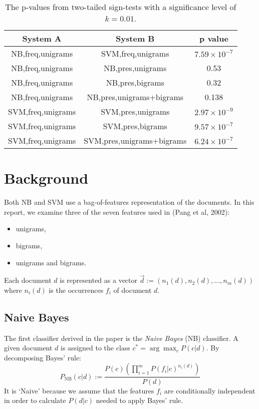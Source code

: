 \documentclass[12pt]{article}
\begin{document}
\begin{multicols}{2}
\begin{table*}[t]
\centering
 \begin{tabular}{|c|c||c|} 
 \hline
  System A & System B & p value\\ [0.5ex] 
 \hline\hline
NB,freq,unigrams & SVM,freq,unigrams & $7.59\times 10^{-7}$\\
 \hline
NB,freq,unigrams & NB,pres,unigrams & 0.53\\
 \hline
NB,freq,unigrams & NB,pres,bigrams & 0.32\\
 \hline
NB,freq,unigrams & NB,pres,unigrams+bigrams & 0.138 \\
 \hline
SVM,freq,unigrams & SVM,pres,unigrams & $2.97\times 10^{-9}$ \\
 \hline
SVM,freq,unigrams & SVM,pres,bigrams & $9.57\times 10^{-7}$ \\
 \hline
 SVM,freq,unigrams & SVM,pres,unigrams+bigrams & $6.24\times 10^{-7}$ \\
 \hline
\end{tabular}
\caption{The p-values from two-tailed sign-tests with a significance level of $k = 0.01$.} \label{table:p-values}
\end{table*}

\section{Background}

Both NB and SVM use a bag-of-features representation of the documents. In this report, we examine three of the seven features used in (Pang et al, 2002):
\vspace{-\topsep}
\begin{itemize}
\setlength{\parskip}{0pt}
\setlength{\itemsep}{0pt plus 1pt}
	\item unigrams,
	\item bigrams,
	\item unigrams and bigrams.
\end{itemize}
\vspace{-\topsep}

Each document $d$ is represented as a vector $\vec{d} := (n_{1}(d), n_{2}(d),\ldots,n_{m}(d))$ where $n_{i}(d)$ is the occurrences $f_{i}$ of document $d$.

\subsection{Naive Bayes}

The first classifier derived in the paper is the \emph{Naive Bayes} (NB) classifier. A given document $d$ is assigned to the class $c^{*} = \arg \max_{c}P(c | d)$. By decomposing Bayes' rule:
\[P_\mathrm{NB}(c | d) := \frac{P(c)(\prod^{m}_{i=1}P(f_{i} | c)^{n_{i}(d)})}{P(d)} \]
It is `Naive' because we assume that the features $f_{i}$ are conditionally independent in order to calculate $P(d|c)$ needed to apply Bayes' rule.


\end{multicols}
\end{document}
